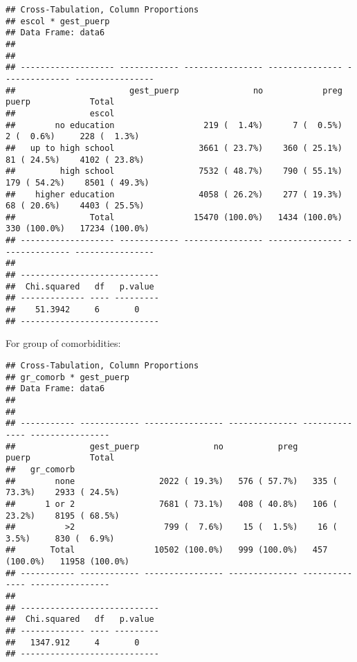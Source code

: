 \documentclass[
]{article}
\newenvironment{Shaded}{\begin{snugshade}}{\end{snugshade}}
\newcommand{\DataTypeTok}[1]{\textcolor[rgb]{0.13,0.29,0.53}{#1}}
\newcommand{\KeywordTok}[1]{\textcolor[rgb]{0.13,0.29,0.53}{\textbf{#1}}}
\newcommand{\NormalTok}[1]{#1}
\newcommand{\OperatorTok}[1]{\textcolor[rgb]{0.81,0.36,0.00}{\textbf{#1}}}
\newcommand{\OtherTok}[1]{\textcolor[rgb]{0.56,0.35,0.01}{#1}}
\newcommand{\StringTok}[1]{\textcolor[rgb]{0.31,0.60,0.02}{#1}}
\begin{document}
\begin{verbatim}
## Cross-Tabulation, Column Proportions  
## escol * gest_puerp  
## Data Frame: data6  
## 
## 
## ------------------- ------------ ---------------- --------------- -------------- ----------------
##                       gest_puerp               no            preg          puerp            Total
##               escol                                                                              
##        no education                  219 (  1.4%)      7 (  0.5%)     2 (  0.6%)     228 (  1.3%)
##   up to high school                 3661 ( 23.7%)    360 ( 25.1%)    81 ( 24.5%)    4102 ( 23.8%)
##         high school                 7532 ( 48.7%)    790 ( 55.1%)   179 ( 54.2%)    8501 ( 49.3%)
##    higher education                 4058 ( 26.2%)    277 ( 19.3%)    68 ( 20.6%)    4403 ( 25.5%)
##               Total                15470 (100.0%)   1434 (100.0%)   330 (100.0%)   17234 (100.0%)
## ------------------- ------------ ---------------- --------------- -------------- ----------------
## 
## ----------------------------
##  Chi.squared   df   p.value 
## ------------- ---- ---------
##    51.3942     6       0    
## ----------------------------
\end{verbatim}

For group of comorbidities:

\begin{Shaded}
\end{Shaded}

\begin{verbatim}
## Cross-Tabulation, Column Proportions  
## gr_comorb * gest_puerp  
## Data Frame: data6  
## 
## 
## ----------- ------------ ---------------- -------------- -------------- ----------------
##               gest_puerp               no           preg          puerp            Total
##   gr_comorb                                                                             
##        none                 2022 ( 19.3%)   576 ( 57.7%)   335 ( 73.3%)    2933 ( 24.5%)
##      1 or 2                 7681 ( 73.1%)   408 ( 40.8%)   106 ( 23.2%)    8195 ( 68.5%)
##          >2                  799 (  7.6%)    15 (  1.5%)    16 (  3.5%)     830 (  6.9%)
##       Total                10502 (100.0%)   999 (100.0%)   457 (100.0%)   11958 (100.0%)
## ----------- ------------ ---------------- -------------- -------------- ----------------
## 
## ----------------------------
##  Chi.squared   df   p.value 
## ------------- ---- ---------
##   1347.912     4       0    
## ----------------------------
\end{verbatim}
\end{document}
